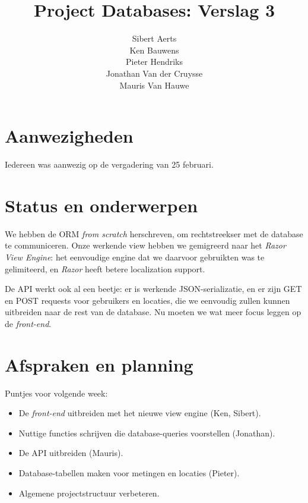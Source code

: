 \documentclass[10pt,a4paper]{article}
\author{Sibert Aerts\\
Ken Bauwens\\
Pieter Hendriks\\
Jonathan Van der Cruysse\\
Mauris Van Hauwe}
\title{Project Databases: Verslag 3}
\date{}
\begin{document}
  \maketitle
  \section{Aanwezigheden}
  Iedereen was aanwezig op de vergadering van 25 februari.
  
  \section{Status en onderwerpen}
  We hebben de ORM \emph{from scratch} herschreven, om rechtstreekser met de 
  database te communiceren. Onze werkende view hebben we gemigreerd naar het 
  \emph{Razor View Engine}: het eenvoudige engine dat we daarvoor gebruikten 
  was te gelimiteerd, en \emph{Razor} heeft betere localization support.
  
  De API werkt ook al een beetje: er is werkende JSON-serializatie, en er zijn 
  GET en POST requests voor gebruikers en locaties, die we eenvoudig zullen 
  kunnen uitbreiden naar de rest van de database. Nu moeten we wat meer focus 
  leggen op de \emph{front-end}.
  
  \section{Afspraken en planning}
  Puntjes voor volgende week:
  \begin{itemize}
    \item De \emph{front-end} uitbreiden met het nieuwe view engine (Ken, 
    Sibert).
    \item Nuttige functies schrijven die database-queries voorstellen 
    (Jonathan).
    \item De API uitbreiden (Mauris).
    \item Database-tabellen maken voor metingen en locaties (Pieter).
    \item Algemene projectstructuur verbeteren.
  \end{itemize}
\end{document}
